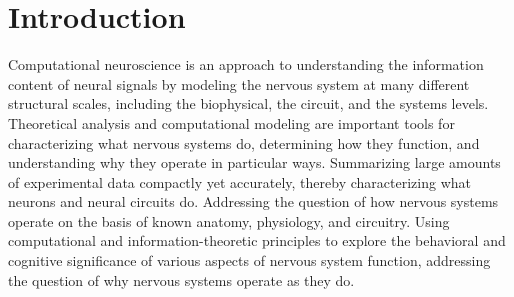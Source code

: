 \chapter*{Introduction}
\label{Introduction}
  
  Computational neuroscience is an approach to understanding the information content of neural signals by modeling the nervous system at many different structural scales, including the biophysical, the circuit, and the systems levels. Theoretical analysis and computational modeling are important tools for characterizing what nervous systems do, determining how they function, and understanding why they operate in particular ways.
  Summarizing large amounts of experimental data compactly yet accurately, thereby characterizing what neurons and neural circuits do.
  Addressing the question of how nervous systems operate on the basis of known anatomy, physiology, and circuitry.
  Using computational and information-theoretic principles to explore the behavioral and cognitive significance of various aspects of nervous system function, addressing the question of why nervous systems operate as they do.


